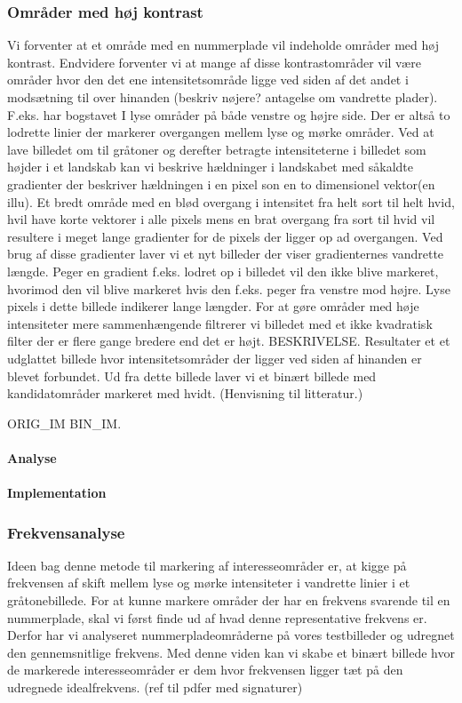 \subsubsection*{Områder med høj kontrast}
Vi forventer at et område med en nummerplade vil indeholde områder med høj kontrast. Endvidere forventer vi at mange af disse kontrastområder vil være områder hvor den det ene intensitetsområde ligge ved siden af det andet i modsætning til over hinanden (beskriv nøjere? antagelse om vandrette plader). F.eks. har bogstavet I lyse områder på både venstre og højre side. Der er altså to lodrette linier der markerer overgangen mellem lyse og mørke områder. Ved at lave billedet om til gråtoner og derefter betragte intensiteterne i billedet som højder i et landskab kan vi beskrive hældninger i landskabet med såkaldte gradienter der beskriver hældningen i en pixel son en to dimensionel vektor(en illu). Et bredt område med en blød overgang i intensitet fra helt sort til helt hvid, hvil have korte vektorer i alle pixels mens en brat overgang fra sort til hvid vil resultere i meget lange gradienter for de pixels der ligger op ad overgangen. Ved brug af disse gradienter laver vi et nyt billeder der viser gradienternes vandrette længde. Peger en gradient f.eks. lodret op i billedet vil den ikke blive markeret, hvorimod den vil blive markeret hvis den f.eks. peger fra venstre mod højre. Lyse pixels i dette billede indikerer lange længder. For at gøre områder med høje intensiteter mere sammenhængende filtrerer vi billedet med et ikke kvadratisk filter der er flere gange bredere end det er højt. BESKRIVELSE. Resultater et et udglattet billede hvor intensitetsområder der ligger ved siden af hinanden er blevet forbundet. Ud fra dette billede laver vi et binært billede med kandidatområder markeret med hvidt. (Henvisning til litteratur.)

ORIG_IM BIN_IM.

\paragraph*{Analyse}
\paragraph*{Implementation}

\subsubsection*{Frekvensanalyse}
Ideen bag denne metode til markering af interesseområder er, at kigge på frekvensen af skift mellem lyse og mørke intensiteter i vandrette linier i et gråtonebillede. For at kunne markere områder der har en frekvens svarende til en nummerplade, skal vi først finde ud af hvad denne representative frekvens er. Derfor har vi analyseret nummerpladeområderne på vores testbilleder og udregnet den gennemsnitlige frekvens. Med denne viden kan vi skabe et binært billede hvor de markerede interesseområder er dem hvor frekvensen ligger tæt på den udregnede idealfrekvens. (ref til pdfer med signaturer)

